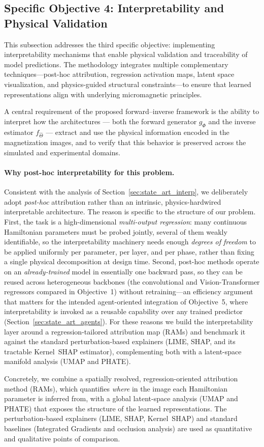 \documentclass[letterpaper, 12, one column]{article}
\begin{document}
\subsection{Specific Objective 4: Interpretability and Physical Validation}

This subsection addresses the third specific objective: implementing interpretability mechanisms that enable physical validation and traceability of model predictions. The methodology integrates multiple complementary techniques—post-hoc attribution, regression activation maps, latent space visualization, and physics-guided structural constraints—to ensure that learned representations align with underlying micromagnetic principles.

A central requirement of the proposed forward--inverse framework is the ability to interpret how the architectures --- both the forward generator $g_{\Phi}$ and the inverse estimator $f_{\hat{\Theta}}$ --- extract and use the physical information encoded in the magnetization images, and to verify that this behavior is preserved across the simulated and experimental domains.

{\color[rgb]{0,0,1}\paragraph{Why post-hoc interpretability for this problem.}
Consistent with the analysis of Section~\ref{sec:state_art_interp}, we deliberately adopt \emph{post-hoc} attribution rather than an intrinsic, physics-hardwired interpretable architecture. The reason is specific to the structure of our problem. First, the task is a high-dimensional \emph{multi-output regression}: many continuous Hamiltonian parameters must be probed jointly, several of them weakly identifiable, so the interpretability machinery needs enough \emph{degrees of freedom} to be applied uniformly per parameter, per layer, and per phase, rather than fixing a single physical decomposition at design time. Second, post-hoc methods operate on an \emph{already-trained} model in essentially one backward pass, so they can be reused across heterogeneous backbones (the convolutional and Vision-Transformer regressors compared in Objective~1) without retraining—an efficiency argument that matters for the intended agent-oriented integration of Objective~5, where interpretability is invoked as a reusable capability over any trained predictor (Section~\ref{sec:state_art_agents}). For these reasons we build the interpretability layer around a regression-tailored attribution map (RAMs) and benchmark it against the standard perturbation-based explainers (LIME, SHAP, and its tractable Kernel~SHAP estimator), complementing both with a latent-space manifold analysis (UMAP and PHATE).

Concretely, we combine a spatially resolved, regression-oriented attribution method (RAMs), which quantifies \emph{where} in the image each Hamiltonian parameter is inferred from, with a global latent-space analysis (UMAP and PHATE) that exposes the structure of the learned representations. The perturbation-based explainers (LIME, SHAP, Kernel~SHAP) and standard baselines (Integrated Gradients and occlusion analysis) are used as quantitative and qualitative points of comparison.}
\end{document}
